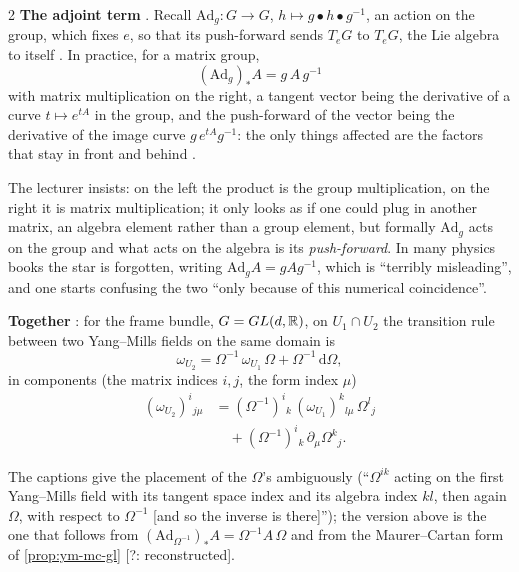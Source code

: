 \begin{paracol}{2}
\textbf{The adjoint term}   . Recall $\mathrm{Ad}_g\colon G\to G$, $h\mapsto g\bullet h\bullet g^{-1}$, an action on the group, which fixes $e$, so that its push-forward sends $T_eG$ to $T_eG$, the Lie algebra to itself   . In practice, for a matrix group,
\[
  (\mathrm{Ad}_g)_*A=g\,A\,g^{-1}
\]
with matrix multiplication on the right, a tangent vector being the derivative of a curve $t\mapsto e^{tA}$ in the group, and the push-forward of the vector being the derivative of the image curve $g\,e^{tA}g^{-1}$: the only things affected are the factors that stay in front and behind      .
\begin{aside}
The lecturer insists: on the left the product is the group multiplication, on the right it is matrix multiplication; it only looks as if one could plug in another matrix, an algebra element rather than a group element, but formally $\mathrm{Ad}_g$ acts on the group and what acts on the algebra is its \emph{push-forward}. In many physics books the star is forgotten, writing $\mathrm{Ad}_gA=gAg^{-1}$, which is ``terribly misleading'', and one starts confusing the two ``only because of this numerical coincidence''.  
\end{aside}
\textbf{Together}  : for the frame bundle, $G=GL(d,\mathbb{R})$, on $U_1\cap U_2$ the transition rule between two Yang--Mills fields on the same domain is
\[
  \omega_{U_2}=\Omega^{-1}\,\omega_{U_1}\,\Omega+\Omega^{-1}\,\mathrm d\Omega ,
\]
in components (the matrix indices $i,j$, the form index $\mu$)
\[
  \begin{aligned}
  (\omega_{U_2})^i{}_{j\mu}&=(\Omega^{-1})^i{}_k\,(\omega_{U_1})^k{}_{l\mu}\,\Omega^l{}_j\\
  &\quad+(\Omega^{-1})^i{}_k\,\partial_\mu\Omega^k{}_j .
  \end{aligned}
\]
      
\begin{coursenote}
The captions give the placement of the $\Omega$'s ambiguously (``$\Omega^{ik}$ acting on the first Yang--Mills field with its tangent space index and its algebra index $kl$, then again $\Omega$, with respect to $\Omega^{-1}$ [and so the inverse is there]''); the version above is the one that follows from $(\mathrm{Ad}_{\Omega^{-1}})_*A=\Omega^{-1}A\,\Omega$ and from the Maurer--Cartan form of \cref{prop:ym-mc-gl} [?: reconstructed]. 

\end{coursenote}
\end{paracol}
